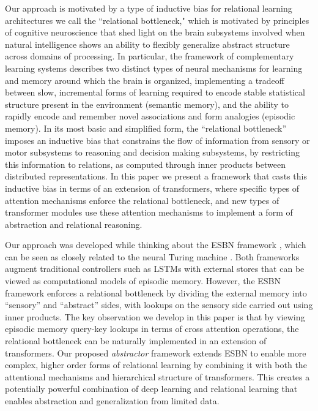 Our approach is motivated by a type of inductive bias for relational learning architectures we call the ``relational bottleneck," which is motivated by principles of cognitive neuroscience that shed light on the brain subsystems involved when natural intelligence shows an ability to flexibly generalize abstract structure across domains of processing. In particular, the framework of complementary learning systems \citep{McClelland:1995, Kumaran:2016} describes two distinct types of neural mechanisms for learning and memory around which the brain is organized, implementing a tradeoff between slow, incremental forms of learning required to encode stable statistical structure present in the environment (semantic memory), and the ability to rapidly encode and remember novel associations and form analogies (episodic memory). In its most basic and simplified form, the ``relational bottleneck'' imposes an inductive bias that constrains the flow of information from sensory or motor subsystems to reasoning and decision making subsystems, by restricting this information to relations, as computed through inner products between distributed representations. In this paper we present a framework that casts this inductive bias in terms of 
an extension of transformers, where specific types of attention mechanisms enforce the relational bottleneck, 
and new types of transformer modules use these attention mechanisms to implement a form of abstraction and relational reasoning.

Our approach was developed while thinking about the ESBN framework \citep{esbn}, which can be seen as 
closely related to the neural Turing machine \citep{NTM}. Both frameworks augment traditional controllers such as 
LSTMs with external stores that can be viewed as computational models of episodic memory. However, the ESBN framework enforces a relational bottleneck by dividing the external memory into ``sensory'' and ``abstract'' sides, with lookups on the sensory side carried out using inner products. The key observation we develop in this paper is that by viewing episodic memory query-key lookups in terms of cross attention operations, the relational bottleneck can be 
naturally implemented in an extension of transformers. Our proposed \textit{abstractor} framework extends ESBN to enable more complex, higher order forms of relational learning by combining it with both the attentional mechanisms and hierarchical structure of transformers. This creates a potentially powerful combination of deep learning and relational learning that enables abstraction and generalization from limited data.




